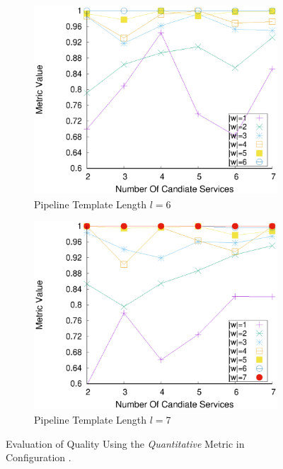 \begin{figure}[ht!]
\begin{subfigure}{0.49\textwidth}
        \label{fig:quality_window_wide_perce_n5}
      \end{subfigure}
      \hfill
      \begin{subfigure}{0.49\textwidth}
        \includegraphics[width=\textwidth]{Images/graphs/window_quality_performance_diff_perce_n7_s7_20_100_n6}
        \caption{Pipeline Template Length $l$$=$6}
        \label{fig:quality_window_wide_perce_n6}
      \end{subfigure}
      \hfill
      \begin{subfigure}{0.49\textwidth}
        \includegraphics[width=\textwidth]{Images/graphs/window_quality_performance_diff_perce_n7_s7_20_100_n7}
        \caption{Pipeline Template Length $l$$=$7}
        \label{fig:quality_window_wide_perce_n7}
      \end{subfigure}

      \caption{Evaluation of Quality Using the \emph{Quantitative} Metric in Configuration \wide.}
      \label{fig:quality_window_perce_wide}

    \end{figure}


